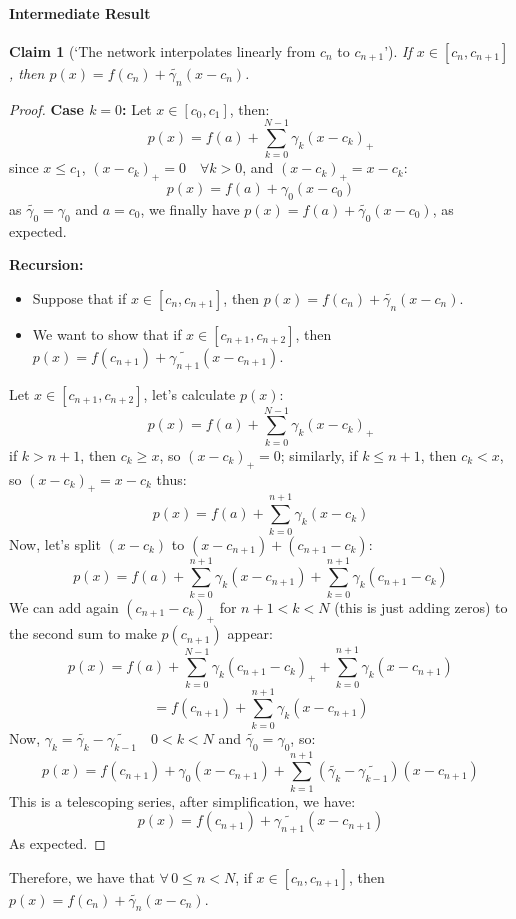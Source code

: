 \documentclass[]{article}
\newtheorem*{claim}{Claim}
\begin{document}
\paragraph{Intermediate Result}
\begin{claim}[`The network interpolates linearly from $c_n$ to $c_{n+1}$']
	If $x \in \left[ c_n, c_{n+1} \right]$, then $p(x) = f(c_n) + \tilde{\gamma_n}(x-c_n)$.
\end{claim}
\begin{proof}
	\textbf{Case $k=0$:}\newline
	Let $x \in \left[ c_0, c_1 \right]$, then:
	$$p(x) = f(a) + \sum_{k=0}^{N-1} \gamma_k (x - c_k)_+$$
	since $x \leq c_1$, $(x - c_k)_+ = 0 \quad \forall k>0$, and $(x - c_k)_+ = x - c_k$: 
	$$p(x) = f(a) + \gamma_0 (x - c_0)$$
	as $\tilde{\gamma_0} =\gamma_0$ and $a = c_0$, we finally have $p(x) = f(a) + \tilde{\gamma_0}(x - c_0)$, as expected.
	
	\textbf{Recursion:}\newline
	\begin{itemize}
		\item Suppose that if $x \in \left[ c_n, c_{n+1} \right]$, then $p(x) = f(c_n) + \tilde{\gamma_n}(x-c_n)$.
		\item We want to show that if $x \in \left[ c_{n+1}, c_{n+2} \right]$, then $p(x) = f(c_{n+1}) + \tilde{\gamma_{n+1}}(x-c_{n+1})$.
	\end{itemize}
	Let $x \in \left[ c_{n+1}, c_{n+2} \right]$, let's calculate $p(x)$:
	$$p(x) = f(a) + \sum_{k=0}^{N-1} \gamma_k (x - c_k)_+$$
	if $k > n+1$, then $c_k \geq x$, so $(x - c_k)_+ = 0$; similarly, 
	if $k \leq n+1$, then $c_k < x$, so $(x - c_k)_+ = x - c_k$ thus:
	$$p(x) = f(a) + \sum_{k=0}^{n+1} \gamma_k (x - c_k)$$
	Now, let's split $(x - c_k)$ to $(x - c_{n+1}) + (c_{n+1} - c_k)$:
	$$p(x) = f(a) + \sum_{k=0}^{n+1} \gamma_k (x - c_{n+1}) + \sum_{k=0}^{n+1} \gamma_k (c_{n+1} - c_k)$$
	We can add again $(c_{n+1} - c_k)_+$ for $n+1 < k < N$ (this is just adding zeros) to the second sum to make $p(c_{n+1})$ appear:
	$$p(x) = f(a) + \sum_{k=0}^{N-1} \gamma_k (c_{n+1} - c_k)_+ + \sum_{k=0}^{n+1} \gamma_k (x - c_{n+1})$$
	$$= f(c_{n+1}) + \sum_{k=0}^{n+1} \gamma_k (x - c_{n+1})$$
	Now, $\gamma_k = \tilde{\gamma_k} - \tilde{\gamma_{k-1}} \quad 0 < k <N$ and $\tilde{\gamma_0} = \gamma_0$, so:
	$$p(x) = f(c_{n+1}) + \gamma_0 (x - c_{n+1}) + \sum_{k=1}^{n+1} (\tilde{\gamma_k} - \tilde{\gamma_{k-1}}) (x - c_{n+1})$$
	This is a telescoping series, after simplification, we have:
	$$p(x) = f(c_{n+1}) + \tilde{\gamma_{n+1}} (x - c_{n+1})$$
	As expected.
\end{proof}
Therefore, we have that $\forall\, 0 \leq n < N$, if $x \in \left[ c_n, c_{n+1} \right]$, then $p(x) = f(c_n) + \tilde{\gamma_n}(x-c_n)$.
\end{document}
